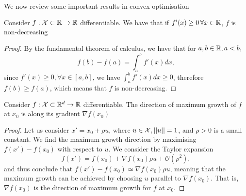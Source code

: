 We now review some important results in convex optimisation

\begin{proposition}
Consider $f:{\mathcal X}\subset\mathbb{R}\to\mathbb{R}$ differentiable. We have that if $f'(x)\geq 0\, \forall x\in\mathbb{R}$, $f$ is non-decreasing
\end{proposition}
\begin{proof}
	By the fundamental theorem of calculus, we have that for $a,b\in\mathbb{R}, a<b,$
	\begin{equation}
		f(b)-f(a) = \int_a^b f'(x)dx,
	\end{equation}
	since $f'(x)\geq 0, \forall x\in[a,b]$, we have $\int_a^b f'(x)dx\geq 0$, therefore $f(b)\geq f(a)$, which means that $f$ is non-decreasing.
\end{proof}


\begin{proposition}
Consider $f:{\mathcal X}\subset\mathbb{R}^d\to\mathbb{R}$ differentiable. The direction of maximum growth of $f$ at $x_0$ is along its gradient $\nabla f(x_0)$
\end{proposition}
\begin{proof}
	Let us consider $x' = x_0 + \rho u$, where $u\in{\mathcal X}, ||u||=1$, and $\rho>0$ is a small constant. We find the maximum growth direction by maximising $f(x')-f(x_0)$ with respect to $u$. We consider the Taylor expansion
	\begin{equation}
		f(x') = f(x_0) + \nabla f(x_0)\rho u  + \mathcal{O}(\rho^2),
	\end{equation}
	and thus conclude that $f(x') - f(x_0) \simeq \nabla f(x_0)\rho u$, meaning that the maximum growth can be achieved by choosing $u$ parallel to $\nabla f(x_0)$. That is, $\nabla f(x_0)$ is the direction of maximum growth for $f$ at $x_0$. 
\end{proof}


